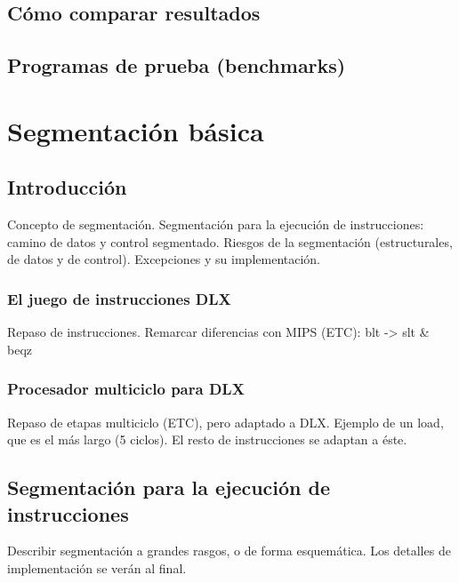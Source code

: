 \documentclass[12pt,onecolumn]{memoir}
\begin{document}
\section{Cómo comparar resultados}

\section{Programas de prueba (benchmarks)}


\chapter{Segmentación básica}
\label{cap:segmentado}


\section{Introducción}
\label{sec:introduccion_segmentado}

Concepto de segmentación. Segmentación para la ejecución de
instrucciones: camino de datos y control segmentado. Riesgos de la
segmentación (estructurales, de datos y de control). Excepciones y su
implementación.

\subsection{El juego de instrucciones DLX}

Repaso de instrucciones. Remarcar diferencias con MIPS (ETC): blt -> slt \& beqz

\subsection{Procesador multiciclo para DLX}

Repaso de etapas multiciclo (ETC), pero adaptado a DLX. Ejemplo de
un load, que es el más largo (5 ciclos). El resto de instrucciones se adaptan a éste. 

\section{Segmentación para la ejecución de instrucciones}

Describir segmentación a grandes rasgos, o de forma esquemática. Los
detalles de implementación se verán al final.
\end{document}
